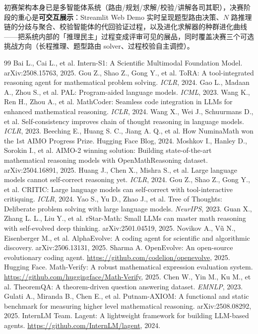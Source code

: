 \documentclass[11pt, a4paper]{ctexart}
\newcommand{\hl}[1]{\textcolor{accentred}{\textbf{#1}}}
\begin{document}
初赛架构本身已是多智能体系统（路由/规划/求解/校验/讲解各司其职），决赛阶段的重心是\hl{可交互展示}：Streamlit Web Demo 实时呈现题型路由决策、$N$ 路推理链的分歧与聚合、校验智能体的代回验证过程，以及进化求解器的种群进化曲线——把系统内部的「推理民主」过程变成评审可见的展品，同时覆盖决赛三个可选挑战方向（长程推理、题型路由 solver、过程校验自主调控）。

\begin{thebibliography}{99}\small
{} Bai L., Cai L., et al. Intern-S1: A Scientific Multimodal Foundation Model. arXiv:2508.15763, 2025.
 Gou Z., Shao Z., Gong Y., et al. ToRA: A tool-integrated reasoning agent for mathematical problem solving. \textit{ICLR}, 2024.
 Gao L., Madaan A., Zhou S., et al. PAL: Program-aided language models. \textit{ICML}, 2023.
 Wang K., Ren H., Zhou A., et al. MathCoder: Seamless code integration in LLMs for enhanced mathematical reasoning. \textit{ICLR}, 2024.
 Wang X., Wei J., Schuurmans D., et al. Self-consistency improves chain of thought reasoning in language models. \textit{ICLR}, 2023.
 Beeching E., Huang S. C., Jiang A. Q., et al. How NuminaMath won the 1st AIMO Progress Prize. Hugging Face Blog, 2024.
 Moshkov I., Hanley D., Sorokin I., et al. AIMO-2 winning solution: Building state-of-the-art mathematical reasoning models with OpenMathReasoning dataset. arXiv:2504.16891, 2025.
 Huang J., Chen X., Mishra S., et al. Large language models cannot self-correct reasoning yet. \textit{ICLR}, 2024.
 Gou Z., Shao Z., Gong Y., et al. CRITIC: Large language models can self-correct with tool-interactive critiquing. \textit{ICLR}, 2024.
 Yao S., Yu D., Zhao J., et al. Tree of Thoughts: Deliberate problem solving with large language models. \textit{NeurIPS}, 2023.
 Guan X., Zhang L. L., Liu Y., et al. rStar-Math: Small LLMs can master math reasoning with self-evolved deep thinking. arXiv:2501.04519, 2025.
 Novikov A., V\~{u} N., Eisenberger M., et al. AlphaEvolve: A coding agent for scientific and algorithmic discovery. arXiv:2506.13131, 2025.
 Sharma A. OpenEvolve: An open-source evolutionary coding agent. \url{https://github.com/codelion/openevolve}, 2025.
 Hugging Face. Math-Verify: A robust mathematical expression evaluation system. \url{https://github.com/huggingface/Math-Verify}, 2025.
 Chen W., Yin M., Ku M., et al. TheoremQA: A theorem-driven question answering dataset. \textit{EMNLP}, 2023.
 Gulati A., Miranda B., Chen E., et al. Putnam-AXIOM: A functional and static benchmark for measuring higher level mathematical reasoning. arXiv:2508.08292, 2025.
 InternLM Team. Lagent: A lightweight framework for building LLM-based agents. \url{https://github.com/InternLM/lagent}, 2024.
\end{thebibliography}
\end{document}
